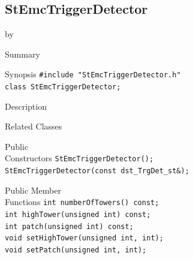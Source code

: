 \documentclass[twoside]{article}
\newcommand{\entrylabel}[1]{\mbox{\textbf{{#1}}}\hfil}%
\newenvironment{entry}
{\begin{list}{}%
    {\renewcommand{\makelabel}{\entrylabel}%
     \setlength{\labelwidth}{90pt}%
     \setlength{\leftmargin}{\labelwidth}
     \advance\leftmargin by \labelsep%
      }%
    }%
  {\end{list}}
\newcommand{\Entrylabel}[1]%
{\raisebox{0pt}[1ex][0pt]{\makebox[\labelwidth][l]%
    {\parbox[t]{\labelwidth}{\hspace{0pt}\textbf{{#1}}}}}}
\newenvironment{Entry}%
{\renewcommand{\entrylabel}{\Entrylabel}\begin{entry}}%
  {\end{entry}}
\begin{document}
\subsection{StEmcTriggerDetector}
\label{sec:StEmcTriggerDetector}
\begin{Entry}
\item[Summary]
\item[Synopsis]
    \verb+#include "StEmcTriggerDetector.h"+\\
    \verb+class StEmcTriggerDetector;+\\
\item[Description]
\item[Related Classes]
\item[Public\\ Constructors]
    \verb+StEmcTriggerDetector();+\\
    \verb+StEmcTriggerDetector(const dst_TrgDet_st&);+\\
\item[Public Member\\ Functions]
    \verb+int numberOfTowers() const;+\\
    \verb+int highTower(unsigned int) const;+\\
    \verb+int patch(unsigned int) const;+\\
    \verb+void setHighTower(unsigned int, int);+\\
    \verb+void setPatch(unsigned int, int);+\\
\end{Entry}
\clearpage
\end{document}
